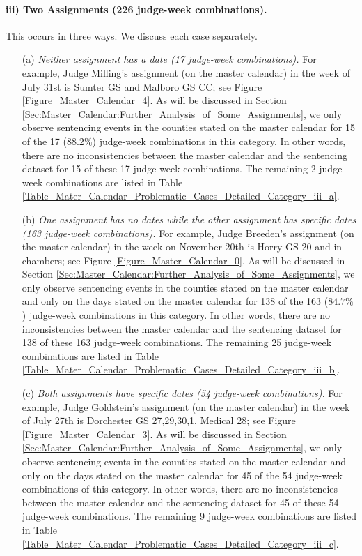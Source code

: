 \documentclass[11pt, oneside]{article}   	%
\theoremstyle{ModifiedStyle}
\begin{document}
\paragraph{iii) Two Assignments (226 judge-week combinations).} 
\label{Category_iii}
This occurs in three ways. We discuss each case separately.
	\begin{itemize}
		\item[(a)] \emph{Neither assignment has a date (17 judge-week combinations).} For example, Judge Milling's assignment (on the master calendar) in the week of July 31st is Sumter GS and Malboro GS CC; see Figure \ref{Figure_Master_Calendar_4}. As will be discussed in Section \ref{Sec:Master_Calendar:Further_Analysis_of_Some_Assignments}, we only observe sentencing events in the counties stated on the master calendar for 15 of the 17 ($88.2\%$) judge-week combinations in this category. In other words, there are no inconsistencies between the master calendar and the sentencing dataset for 15 of these 17 judge-week combinations. The remaining 2 judge-week combinations are listed in Table \ref{Table_Mater_Calendar_Problematic_Cases_Detailed_Category_iii_a}.
		\item[(b)] \emph{One assignment has no dates while the other assignment has specific dates (163 judge-week combinations).} For example, Judge Breeden's assignment (on the master calendar) in the week on November 20th is Horry GS 20 and in chambers; see Figure \ref{Figure_Master_Calendar_0}. As will be discussed in Section \ref{Sec:Master_Calendar:Further_Analysis_of_Some_Assignments}, we only observe sentencing events in the counties stated on the master calendar and only on the days stated on the master calendar for 138 of the 163 ($84.7\%$) judge-week combinations in this category. In other words, there are no inconsistencies between the master calendar and the sentencing dataset for 138 of these 163 judge-week combinations. The remaining 25 judge-week combinations are listed in Table \ref{Table_Mater_Calendar_Problematic_Cases_Detailed_Category_iii_b}.
		\item[(c)] \emph{Both assignments have specific dates (54 judge-week combinations).} For example, Judge Goldstein's assignment (on the master calendar) in the week of July 27th is Dorchester GS 27,29,30,1, Medical 28; see Figure \ref{Figure_Master_Calendar_3}. As will be discussed in Section \ref{Sec:Master_Calendar:Further_Analysis_of_Some_Assignments}, we only observe sentencing events in the counties stated on the master calendar and only on the days stated on the master calendar for 45 of the 54 judge-week combinations of this category. In other words, there are no inconsistencies between the master calendar and the sentencing dataset for 45 of these 54 judge-week combinations. The remaining 9 judge-week combinations are listed in Table \ref{Table_Mater_Calendar_Problematic_Cases_Detailed_Category_iii_c}.
	\end{itemize}
\end{document}
